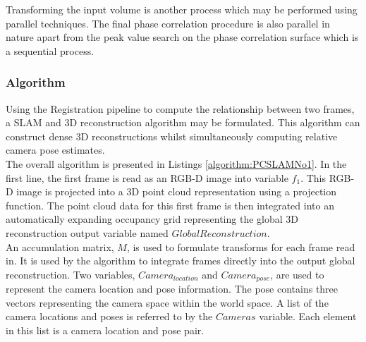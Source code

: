 Transforming the input volume is another process which may be performed using parallel techniques. The final phase correlation procedure is also parallel in nature apart from the peak value search on the phase correlation surface which is a sequential process. \\



\subsubsection{Algorithm}

Using the Registration pipeline to compute the relationship between two frames, a SLAM and 3D reconstruction algorithm may be formulated. This algorithm can construct dense 3D reconstructions whilst simultaneously computing relative camera pose estimates. \\

 
The overall algorithm is presented in Listings \ref{algorithm:PCSLAMNo1}. In the first line, the first frame is read as an RGB-D image into variable $f_1$. This RGB-D image is projected into a 3D point cloud representation using a projection function. The point cloud data for this first frame is then integrated into an automatically expanding occupancy grid representing the global 3D reconstruction output variable named $GlobalReconstruction$. \\

An accumulation matrix, $M$, is used to formulate transforms for each frame read in. It is used by the algorithm to integrate frames directly into the output global reconstruction. Two variables, $Camera_{location}$ and $Camera_{pose}$, are used to represent the camera location and pose information. The pose contains three vectors representing the camera space within the world space. A list of the camera locations and poses is referred to by the $Cameras$ variable. Each element in this list is a camera location and pose pair. \\

